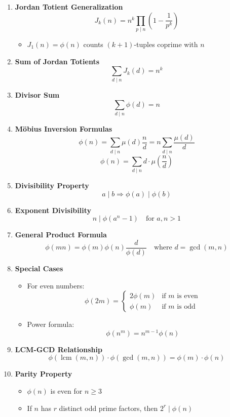 \documentclass[twoside]{article}
\begin{document}
\begin{multicols*}{2}
\begin{enumerate}[leftmargin=*]
    \item \textbf{Jordan Totient Generalization}
        \[J_k(n) = n^k\prod_{p \mid n}\left(1 - \frac{1}{p^k}\right)\]
        \begin{itemize}
            \item $J_1(n) = \phi(n)$ counts $(k+1)$-tuples coprime with $n$
        \end{itemize}
    
    \item \textbf{Sum of Jordan Totients}
        \[\sum_{d \mid n} J_k(d) = n^k\]
    
    \item \textbf{Divisor Sum}
        \[\sum_{d \mid n} \phi(d) = n\]
    
    \item \textbf{Möbius Inversion Formulas}
        \[\phi(n) = \sum_{d \mid n} \mu(d)\frac{n}{d} = n\sum_{d \mid n} \frac{\mu(d)}{d}\]
        \[\phi(n) = \sum_{d \mid n} d \cdot \mu\left(\frac{n}{d}\right)\]
    
    \item \textbf{Divisibility Property}
        \[a \mid b \Rightarrow \phi(a) \mid \phi(b)\]
    
    \item \textbf{Exponent Divisibility}
        \[n \mid \phi(a^n - 1) \quad \text{for } a, n > 1\]
    
    \item \textbf{General Product Formula}
        \[\phi(mn) = \phi(m)\phi(n)\frac{d}{\phi(d)} \quad \text{where } d = \gcd(m,n)\]
    
    \item \textbf{Special Cases}
        \begin{itemize}
            \item For even numbers:
            \[\phi(2m) = \begin{cases}
                2\phi(m) & \text{if } m \text{ is even} \\
                \phi(m) & \text{if } m \text{ is odd}
            \end{cases}\]
            \item Power formula:
            \[\phi(n^m) = n^{m-1}\phi(n)\]
        \end{itemize}
    
    \item \textbf{LCM-GCD Relationship}
        \[\phi(\operatorname{lcm}(m,n)) \cdot \phi(\gcd(m,n)) = \phi(m) \cdot \phi(n)\]
    
    \item \textbf{Parity Property}
        \begin{itemize}
            \item $\phi(n)$ is even for $n \geq 3$
            \item If $n$ has $r$ distinct odd prime factors, then $2^r \mid \phi(n)$
        \end{itemize}
    

\end{enumerate}
\end{multicols*}
\end{document}
